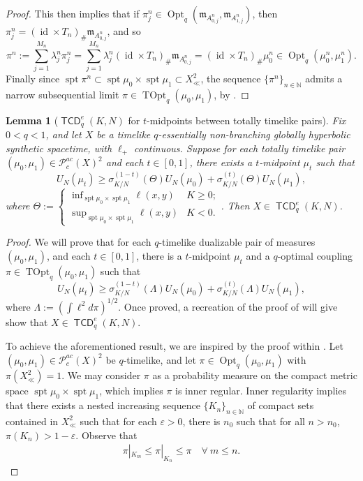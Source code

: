 \documentclass{article}
\renewcommand{\epsilon}{\varepsilon}
\newcommand{\N}{\mathbb{N}}
\newcommand{\m}{\mathfrak{m}}
\DeclareMathOperator{\spt}{spt}
\newcommand{\Pcal}{\mathcal{P}}
\DeclareMathOperator{\id}{id}
\DeclareMathOperator{\TCD}{\mathsf{TCD}}
\DeclareMathOperator{\Opt}{Opt}
\DeclareMathOperator{\TOpt}{TOpt}
\newtheorem{lemma}[theorem]{Lemma}
\theoremstyle{definition}
\begin{document}
{\begin{proof}
This then implies that if $\pi_j^n\in \Opt_q(\m_{A_{0,j}^n},\m_{A_{1,j}^n})$, then $\pi_j^n=(\id\times T_n)_\#\m_{A_{0,j}^n}$, and so 
\[\pi^n:=\sum_{j=1}^{M_n}\lambda_j^n \pi_j^n = \sum_{j=1}^{M_n}\lambda_j^n (\id\times T_n)_\#\m_{A_{0,j}^n}= (\id\times T_n)_\# \mu_0^n \in \Opt_q(\mu_0^n, \mu_1^n).\]
Finally since $\spt\pi^n\subset \spt\mu_0\times \spt\mu_1\subset X_\ll^2$, the sequence $\{\pi^n\}_{n\in\N}$ admits a narrow subsequential limit $\pi\in \TOpt_q(\mu_0,\mu_1)$, by .
\end{proof} 

\begin{lemma}[$\TCD_q^e(K,N)$ for $t$-midpoints between totally timelike pairs]\label{midpointTCDe} Fix $0<q<1$, and let $X$ be a timelike $q$-essentially non-branching globally hyperbolic synthetic spacetime, with $\ell_+$ continuous. Suppose for each totally timelike pair $(\mu_0,\mu_1)\in \Pcal_c^{ac}(X)^2$ and each $t\in [0,1]$, there exists a $t$-midpoint $\mu_t$ such that 
\[U_N(\mu_t)\geq \sigma_{K/N}^{(1-t)}(\Theta)U_N(\mu_0)+\sigma_{K/N}^{(t)}(\Theta)U_N(\mu_1),\]
where $\Theta:= \begin{cases}
\inf_{\spt\mu_0\times\spt\mu_1} \ell(x,y) & K\geq 0;\\
\sup_{\spt\mu_0\times \spt\mu_1}\ell(x,y) &K<0.
\end{cases}$. Then $X\in \TCD_q^e(K,N)$.
\end{lemma}
\begin{proof}
We will prove that for each $q$-timelike dualizable pair of measures $(\mu_0,\mu_1)$, and each $t\in [0,1]$, there is a $t$-midpoint $\mu_t$ and a $q$-optimal coupling $\pi\in\TOpt_q(\mu_0,\mu_1)$ such that 
\[U_N(\mu_t)\geq \sigma_{K/N}^{(1-t)}(\Lambda)U_N(\mu_0)+\sigma_{K/N}^{(t)}(\Lambda)U_N(\mu_1),\]
where $\Lambda :=(\int \ell^2d\pi)^{1/2}$. Once proved, a recreation of the proof of  will give show that $X\in \TCD_q^e(K,N)$. 


To achieve the aforementioned result, we are inspired by the proof within \cite[Thm. 7.1]{McCann}. 
Let $(\mu_0, \mu_1)\in \Pcal_c^{ac}(X)^2$ be $q$-timelike, and let $\pi\in \Opt_q(\mu_0,\mu_1)$ with $\pi(X_\ll^2)=1$. We may consider $\pi$ as a probability measure on the compact metric space $\spt\mu_0\times \spt\mu_1$, which implies $\pi$ is inner regular. Inner regularity implies that there exists a nested increasing sequence $\{K_n\}_{n\in\N}$ of compact sets contained in $X_\ll^2$ such that for each $\epsilon>0$, there is $n_0$ such that for all $n>n_0$, $\pi(K_n)>1-\epsilon$. Observe that 
\begin{align}\label{pieq1}
\pi|_{K_m}\leq \pi|_{K_n}\leq\pi \quad \forall\ m\leq n.
\end{align}


\end{proof}}
\end{document}
